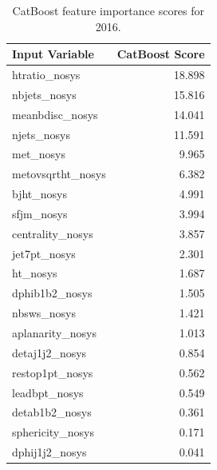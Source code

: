 \documentclass[twoside]{article}
\begin{document}
\begin{table}[htbp]
\centering
\begin{tabular}{l r}
\hline
\textbf{Input Variable} & \textbf{CatBoost Score} \\
\hline
htratio\_nosys       & 18.898 \\
nbjets\_nosys        & 15.816 \\
meanbdisc\_nosys     & 14.041 \\
njets\_nosys         & 11.591 \\
met\_nosys           & 9.965  \\
metovsqrtht\_nosys   & 6.382  \\
bjht\_nosys          & 4.991  \\
sfjm\_nosys          & 3.994  \\
centrality\_nosys    & 3.857  \\
jet7pt\_nosys        & 2.301  \\
ht\_nosys            & 1.687  \\
dphib1b2\_nosys      & 1.505  \\
nbsws\_nosys         & 1.421  \\
aplanarity\_nosys    & 1.013  \\
detaj1j2\_nosys      & 0.854  \\
restop1pt\_nosys     & 0.562  \\
leadbpt\_nosys       & 0.549  \\
detab1b2\_nosys      & 0.361  \\
sphericity\_nosys    & 0.171  \\
dphij1j2\_nosys      & 0.041  \\
\hline
\end{tabular}
\caption{CatBoost feature importance scores for 2016.}
\label{tab:catboost_scores_2016}
\end{table}
\end{document}
